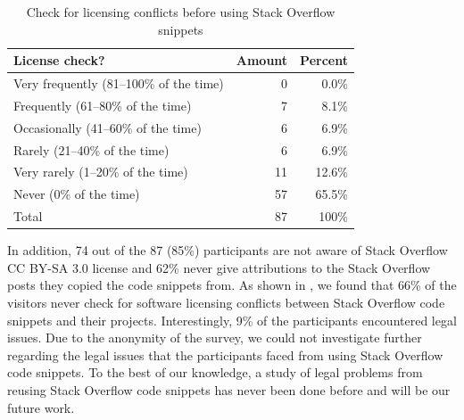 \documentclass[10pt,journal,compsoc]{IEEEtran}
\begin{document}
\begin{table}
	\centering
	\caption{Check for licensing conflicts before using Stack Overflow snippets}
	\label{tab:visitor_survey_license_check}
	\begin{tabular}{lrr}
		\toprule
		License check? & Amount & Percent \\
		\midrule
		Very frequently (81--100\% of the time) & 0 & 0.0\% \\
		Frequently (61--80\% of the time) & 7 & 8.1\%
\\
		Occasionally (41--60\% of the time) & 6 & 6.9\%
\\
		Rarely (21--40\% of the time) & 6 & 6.9\% \\
		Very rarely (1--20\% of the time) & 11 & 12.6\% \\
		Never (0\% of the time)	& 57 & 65.5\% \\
		\midrule
		Total & 87 & 100\% \\
\bottomrule
\end{tabular}
\end{table}

In addition, 74 out of the 87 (85\%) participants are not
aware of Stack Overflow CC BY-SA 3.0 license and 62\% never give attributions to
the Stack Overflow posts they copied the code snippets from. 
As shown in , we found that 66\%
of the visitors never check for software licensing conflicts between Stack
Overflow code snippets and their projects. Interestingly, 9\% of the
participants encountered legal issues. Due to the anonymity of
the survey, we could not investigate further regarding the legal issues that the
participants faced from using Stack Overflow code snippets.
To the best of our
knowledge, a study of legal problems from reusing Stack Overflow code snippets
has never been done before and will be our future work.

\end{document}

